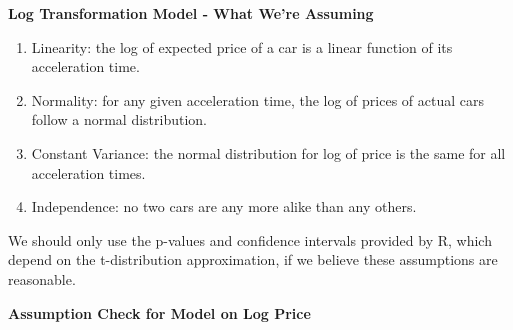 \documentclass[
  letterpaper,
  DIV=11,
  numbers=noendperiod]{scrreprt}
\newenvironment{Shaded}{\begin{snugshade}}{\end{snugshade}}
\newcommand{\AttributeTok}[1]{\textcolor[rgb]{0.40,0.45,0.13}{#1}}
\newcommand{\DecValTok}[1]{\textcolor[rgb]{0.68,0.00,0.00}{#1}}
\newcommand{\FunctionTok}[1]{\textcolor[rgb]{0.28,0.35,0.67}{#1}}
\newcommand{\NormalTok}[1]{\textcolor[rgb]{0.00,0.23,0.31}{#1}}
\newcommand{\OtherTok}[1]{\textcolor[rgb]{0.00,0.23,0.31}{#1}}
\newcommand{\SpecialCharTok}[1]{\textcolor[rgb]{0.37,0.37,0.37}{#1}}
\newcommand{\StringTok}[1]{\textcolor[rgb]{0.13,0.47,0.30}{#1}}
\begin{document}
\textbf{Log Transformation Model - What We're Assuming}

\begin{enumerate}
\def\labelenumi{\arabic{enumi}.}
\item
  Linearity: the log of expected price of a car is a linear function of
  its acceleration time.
\item
  Normality: for any given acceleration time, the log of prices of
  actual cars follow a normal distribution.
\item
  Constant Variance: the normal distribution for log of price is the
  same for all acceleration times.
\item
  Independence: no two cars are any more alike than any others.
\end{enumerate}

We should only use the p-values and confidence intervals provided by R,
which depend on the t-distribution approximation, if we believe these
assumptions are reasonable.

\textbf{Assumption Check for Model on Log Price}

\begin{Shaded}
\end{Shaded}
\end{document}
